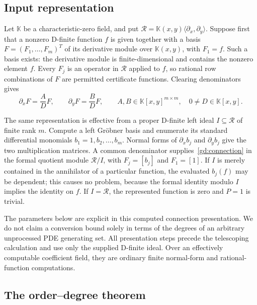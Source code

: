 \subsection{Input representation}
\label{gd:representation}

Let $\mathbb K$ be a characteristic-zero field, and put
$\mathcal R=\mathbb K(x,y)\langle\partial_x,\partial_y\rangle$.
Suppose first that a nonzero D-finite function $f$ is given together with
a basis $F=(F_1,\ldots,F_m)^T$ of its derivative module over
$\mathbb K(x,y)$, with $F_1=f$. Such a basis exists: the derivative
module is finite-dimensional and contains the nonzero element $f$.
Every $F_j$ is an operator in $\mathcal R$ applied to $f$, so rational
row combinations of $F$ are permitted certificate functions. Clearing
denominators gives
\begin{equation}\label{gd:connection}
 \partial_xF=\frac AD F,\qquad
 \partial_yF=\frac BD F,
 \qquad A,B\in\mathbb K[x,y]^{m\times m},\quad
 0\ne D\in\mathbb K[x,y].
\end{equation}

The same representation is effective from a proper D-finite left ideal
$I\subseteq\mathcal R$ of finite rank $m$. Compute a left Gr\"obner
basis and enumerate its standard differential monomials
$b_1=1,b_2,\ldots,b_m$. Normal forms of
$\partial_x b_j$ and $\partial_y b_j$ give the two multiplication
matrices. A common denominator supplies~\eqref{gd:connection} in the
formal quotient module $\mathcal R/I$, with $F_j=[b_j]$ and
$F_1=[1]$. If $I$ is merely contained in the annihilator of a particular
function, the evaluated $b_j(f)$ may be dependent; this causes no problem,
because the formal identity modulo $I$ implies the identity on $f$.
If $I=\mathcal R$, the represented function is zero and $P=1$ is trivial.

The parameters below are explicit in this computed connection
presentation. We do not claim a conversion bound solely in terms of the
degrees of an arbitrary unprocessed PDE generating set. All presentation
steps precede the telescoping calculation and use only the supplied
D-finite ideal. Over an effectively computable coefficient field, they
are ordinary finite normal-form and rational-function computations.

\subsection{The order--degree theorem}


